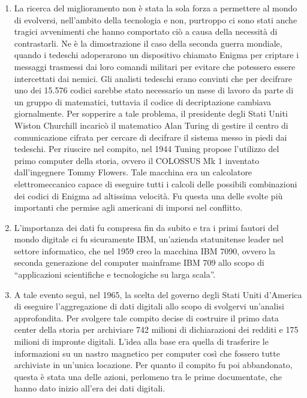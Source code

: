 \begin{enumerate}
    \item La ricerca del miglioramento non è stata la sola forza a permettere al mondo di evolversi, nell’ambito della tecnologia e non, purtroppo ci sono stati anche tragici avvenimenti che hanno comportato ciò a causa della necessità di contrastarli. Ne è la dimostrazione il caso della seconda guerra mondiale, quando i tedeschi adoperarono un dispositivo chiamato Enigma per criptare i messaggi trasmessi dai loro comandi militari per evitare che potessero essere intercettati dai nemici. Gli analisti tedeschi erano convinti che per decifrare uno dei 15.576 codici sarebbe stato necessario un mese di lavoro da parte di un gruppo di matematici, tuttavia il codice di decriptazione cambiava giornalmente. Per sopperire a tale problema, il presidente degli Stati Uniti Wiston Churchill incaricò il matematico Alan Turing di gestire il centro di comunicazione cifrata per cercare di decifrare il sistema messo in piedi dai tedeschi. Per riuscire nel compito, nel 1944 Tuning propose l’utilizzo del primo computer della storia, ovvero il COLOSSUS Mk 1 inventato dall’ingegnere Tommy Flowers. Tale macchina era un calcolatore elettromeccanico capace di eseguire tutti i calcoli delle possibili combinazioni dei codici di Enigma ad altissima velocità. Fu questa una delle svolte più importanti che permise agli americani di imporsi nel conflitto.\cite{computer_history}
    \item L’importanza dei dati fu compresa fin da subito e tra i primi fautori del mondo digitale ci fu sicuramente IBM, un’azienda statunitense leader nel settore informatico, che nel 1959 creo la macchina IBM 7090, ovvero la seconda generazione del computer mainframe IBM 709 allo scopo di “applicazioni scientifiche e tecnologiche su larga scala”.\cite{wikipedia_ibm_7090}
    \item A tale evento seguì, nel 1965, la scelta del governo degli Stati Uniti d’America di eseguire l’aggregazione di dati digitali allo scopo di svolgervi un’analisi approfondita. Per svolgere tale compito decise di costruire il primo data center della storia per archiviare 742 milioni di dichiarazioni dei redditi e 175 milioni di impronte digitali. L’idea alla base era quella di trasferire le informazioni su un nastro magnetico per computer così che fossero tutte archiviate in un’unica locazione. Per quanto il compito fu poi abbandonato, questa è stata una delle azioni, perlomeno tra le prime documentate, che hanno dato inizio all’era dei dati digitali.\cite{lights_on_data_history_of_big_data}

\end{enumerate}
